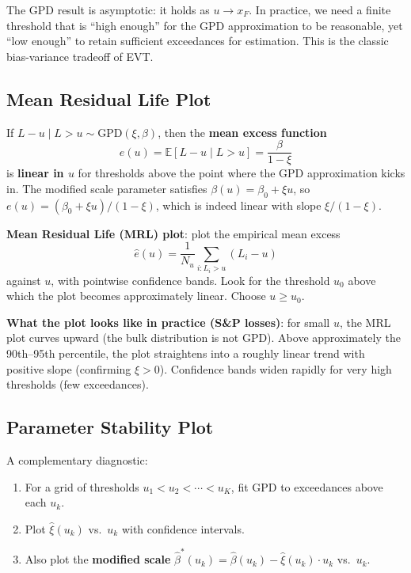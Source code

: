 \documentclass[11pt, a4paper]{article}
\theoremstyle{definition}
\theoremstyle{plain}
\theoremstyle{remark}
\newcommand{\EV}{\mathbb{E}}
\begin{document}
The GPD result is asymptotic: it holds as $u \to x_F$.
In practice, we need a finite threshold that is ``high enough'' for the GPD approximation to be reasonable,
yet ``low enough'' to retain sufficient exceedances for estimation.
This is the classic bias-variance tradeoff of EVT.

\subsection{Mean Residual Life Plot}

\begin{keyidea}
If $L - u \mid L > u \sim \text{GPD}(\xi, \beta)$, then the \textbf{mean excess function}
\[
    e(u) = \EV[L - u \mid L > u] = \frac{\beta}{1 - \xi}
\]
is \textbf{linear in $u$} for thresholds above the point where the GPD approximation kicks in.
The modified scale parameter satisfies $\beta(u) = \beta_0 + \xi u$,
so $e(u) = (\beta_0 + \xi u) / (1 - \xi)$, which is indeed linear with slope $\xi / (1 - \xi)$.

\medskip

\textbf{Mean Residual Life (MRL) plot}: plot the empirical mean excess
\[
    \hat{e}(u) = \frac{1}{N_u}\sum_{i: L_i > u}(L_i - u)
\]
against $u$, with pointwise confidence bands.
Look for the threshold $u_0$ above which the plot becomes approximately linear.
Choose $u \geq u_0$.
\end{keyidea}

\textbf{What the plot looks like in practice (S\&P losses)}:
for small $u$, the MRL plot curves upward (the bulk distribution is not GPD).
Above approximately the 90th--95th percentile, the plot straightens into a roughly linear trend
with positive slope (confirming $\xi > 0$).
Confidence bands widen rapidly for very high thresholds (few exceedances).

\subsection{Parameter Stability Plot}

A complementary diagnostic:

\begin{enumerate}
    \item For a grid of thresholds $u_1 < u_2 < \cdots < u_K$, fit GPD to exceedances above each $u_k$.
    \item Plot $\hat\xi(u_k)$ vs.\ $u_k$ with confidence intervals.
    \item Also plot the \textbf{modified scale} $\hat\beta^*(u_k) = \hat\beta(u_k) - \hat\xi(u_k) \cdot u_k$ vs.\ $u_k$.
\end{enumerate}
\end{document}
